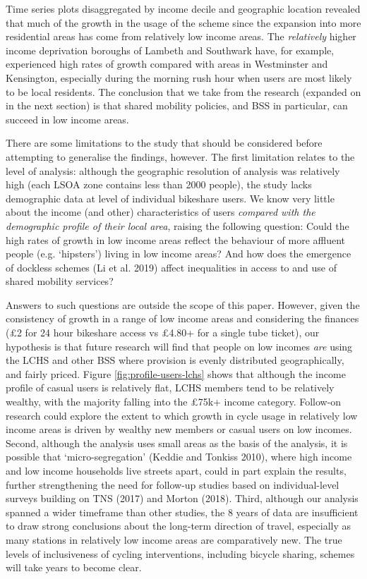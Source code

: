 \documentclass[]{article}
\begin{document}
Time series plots disaggregated by income decile and geographic location revealed that much of the growth in the usage of the scheme since the expansion into more residential areas has come from relatively low income areas.
The \emph{relatively} higher income deprivation boroughs of Lambeth and Southwark have, for example, experienced high rates of growth compared with areas in Westminster and Kensington, especially during the morning rush hour when users are most likely to be local residents.
The conclusion that we take from the research (expanded on in the next section) is that shared mobility policies, and BSS in particular, can succeed in low income areas.

There are some limitations to the study that should be considered before attempting to generalise the findings, however.
The first limitation relates to the level of analysis: although the geographic resolution of analysis was relatively high (each LSOA zone contains less than 2000 people), the study lacks demographic data at level of individual bikeshare users.
We know very little about the income (and other) characteristics of users \emph{compared with the demographic profile of their local area}, raising the following question:
Could the high rates of growth in low income areas reflect the behaviour of more affluent people (e.g. `hipsters') living in low income areas?
And how does the emergence of dockless schemes (Li et al. 2019) affect inequalities in access to and use of shared mobility services?

Answers to such questions are outside the scope of this paper.
However, given the consistency of growth in a range of low income areas and considering the finances (£2 for 24 hour bikeshare access vs £4.80+ for a single tube ticket), our hypothesis is that future research will find that people on low incomes \emph{are} using the LCHS and other BSS where provision is evenly distributed geographically, and fairly priced.
Figure \ref{fig:profile-users-lchs} shows that although the income profile of casual users is relatively flat, LCHS members tend to be relatively wealthy, with the majority falling into the £75k+ income category.
Follow-on research could explore the extent to which growth in cycle usage in relatively low income areas is driven by wealthy new members or casual users on low incomes.
Second, although the analysis uses small areas as the basis of the analysis, it is possible that `micro-segregation' (Keddie and Tonkiss 2010), where high income and low income households live streets apart, could in part explain the results, further strengthening the need for follow-up studies based on individual-level surveys building on TNS (2017) and Morton (2018).
Third, although our analysis spanned a wider timeframe than other studies, the 8 years of data are insufficient to draw strong conclusions about the long-term direction of travel, especially as many stations in relatively low income areas are comparatively new.
The true levels of inclusiveness of cycling interventions, including bicycle sharing, schemes will take years to become clear.
\end{document}
